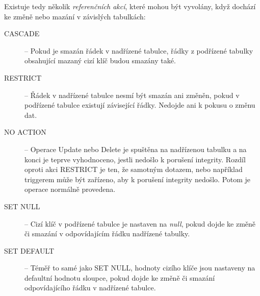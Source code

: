 Existuje tedy několik \emph{referenčních akcí}, které mohou být vyvolány, když
dochází ke změně nebo mazání v závislých tabulkách:
\begin{description}
  \item[CASCADE] -- Pokud je smazán řádek v nadřízené tabulce, řádky z podřízené
  tabulky obsahující mazaný cizí klíč budou smazány také.

  \item[RESTRICT] -- Řádek v nadřízené tabulce nesmí být smazán ani změněn, pokud
  v podřízené tabulce existují závisející řádky. Nedojde ani k pokusu o změnu dat.
  
  \item[NO ACTION] -- Operace Update nebo Delete je spuštěna na nadřízenou tabulku
  a na konci je teprve vyhodnoceno, jestli nedošlo k porušení integrity. Rozdíl
  oproti akci RESTRICT je ten, že samotným dotazem, nebo například triggerem může
  být zařízeno, aby k porušení integrity nedošlo. Potom je operace normálně
  provedena.
  
  \item[SET NULL] -- Cizí klíč v podřízené tabulce je nastaven na \emph{null},
  pokud dojde ke změně či smazání v odpovídajícím řádku nadřízené tabulky.

  \item[SET DEFAULT] -- Téměř to samé jako SET NULL, hodnoty cizího klíče jsou
  nastaveny na defaultní hodnotu sloupce, pokud dojde ke změně či smazání
  odpovídajícího řádku v nadřízené tabulce.
\end{description}
